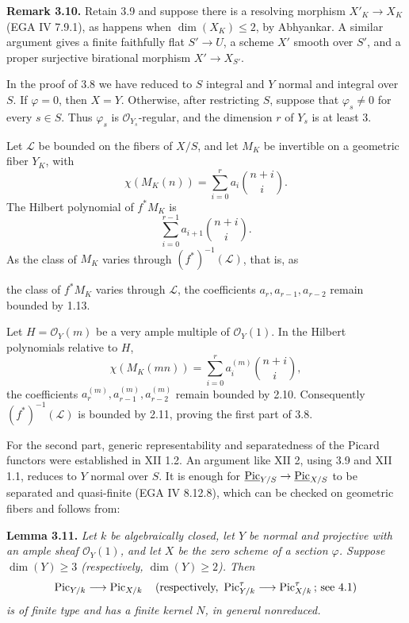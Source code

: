 \textbf{Remark 3.10.} Retain 3.9 and suppose there is a resolving
morphism \(X'_K\to X_K\) (EGA IV 7.9.1), as happens when
\(\dim(X_K)\le2\), by Abhyankar. A similar argument gives a finite
faithfully flat \(S'\to U\), a scheme \(X'\) smooth over \(S'\), and a
proper surjective birational morphism \(X'\to X_{S'}\).

In the proof of 3.8 we have reduced to \(S\) integral and \(Y\) normal and
integral over \(S\). If \(\varphi=0\), then \(X=Y\). Otherwise, after
restricting \(S\), suppose that \(\varphi_s\ne0\) for every \(s\in S\).
Thus \(\varphi_s\) is \(\mathcal O_{Y_s}\)-regular, and the dimension
\(r\) of \(Y_s\) is at least \(3\).

Let \(\mathscr L\) be bounded on the fibers of \(X/S\), and let \(M_K\)
be invertible on a geometric fiber \(Y_K\), with
\[
\chi(M_K(n))=\sum_{i=0}^{r}a_i\binom{n+i}{i}.
\]
The Hilbert polynomial of \(f^*M_K\) is
\[
\sum_{i=0}^{r-1}a_{i+1}\binom{n+i}{i}.
\]
As the class of \(M_K\) varies through \((f^*)^{-1}(\mathscr L)\), that
is, as

the class of \(f^*M_K\) varies through \(\mathscr L\), the coefficients
\(a_r,a_{r-1},a_{r-2}\) remain bounded by 1.13.

Let \(H=\mathcal O_Y(m)\) be a very ample multiple of
\(\mathcal O_Y(1)\). In the Hilbert polynomials relative to \(H\),
\[
\chi(M_K(mn))=\sum_{i=0}^{r}a_i^{(m)}\binom{n+i}{i},
\]
the coefficients \(a_r^{(m)},a_{r-1}^{(m)},a_{r-2}^{(m)}\) remain bounded
by 2.10. Consequently \((f^*)^{-1}(\mathscr L)\) is bounded by 2.11,
proving the first part of 3.8.

For the second part, generic representability and separatedness of the
Picard functors were established in XII 1.2. An argument like XII 2,
using 3.9 and XII 1.1, reduces to \(Y\) normal over \(S\). It is enough
for \(\underline{\operatorname{Pic}}_{Y/S}\to\underline{\operatorname{Pic}}_{X/S}\) to be separated
and quasi-finite (EGA IV 8.12.8), which can be checked on geometric
fibers and follows from:

\textbf{Lemma 3.11.} \emph{Let \(k\) be algebraically closed, let \(Y\)
be normal and projective with an ample sheaf \(\mathcal O_Y(1)\), and let
\(X\) be the zero scheme of a section \(\varphi\). Suppose
\(\dim(Y)\ge3\) (respectively, \(\dim(Y)\ge2\)). Then}
\[
\operatorname{Pic}_{Y/k}\longrightarrow\operatorname{Pic}_{X/k}
\quad
\text{(respectively, }\operatorname{Pic}^\tau_{Y/k}\longrightarrow\operatorname{Pic}^\tau_{X/k}
\text{; see 4.1)}
\]
\emph{is of finite type and has a finite kernel \(N\), in general
nonreduced.}

